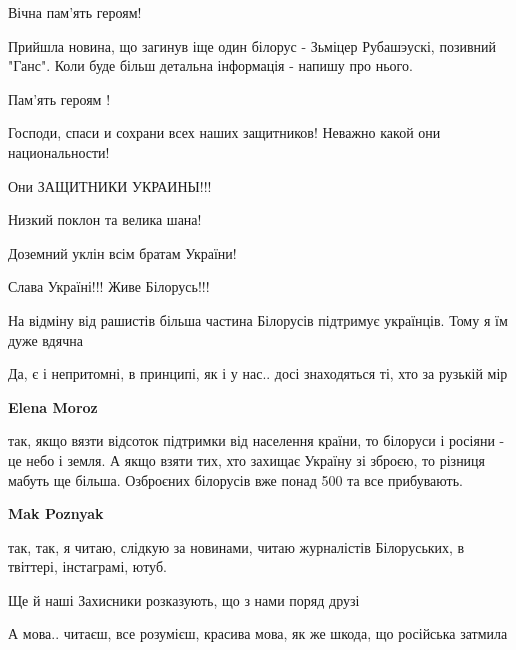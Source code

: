  
 
 
 
 
\zzSecCmt

\begin{itemize} %
Вічна пам'ять героям!

Прийшла новина, що загинув іще один білорус - Зьміцер Рубашэускі, позивний "Ганс". Коли буде більш детальна інформація - напишу про нього.

Пам’ять героям !


Господи, спаси и сохрани всех наших защитников! Неважно какой они
национальности!

Они ЗАЩИТНИКИ УКРАИНЫ!!!

Низкий поклон та велика шана!

Доземний уклін всім братам України!

Слава Україні!!!
Живе Білорусь!!!


На відміну від рашистів більша частина Білорусів підтримує українців. Тому я їм дуже вдячна

Да, є і непритомні, в принципі, як і у нас.. досі знаходяться ті, хто за рузькій мір

\begin{itemize} %
\textbf{Elena Moroz} 

так, якщо вязти відсоток підтримки від населення країни, то білоруси і росіяни
- це небо і земля. А якщо взяти тих, хто захищає Україну зі зброєю, то різниця
мабуть ще більша. Озброєних білорусів вже понад 500 та все прибувають.

\textbf{Mak Poznyak} 

так, так, я читаю, слідкую за новинами, читаю журналістів Білоруських, в
твіттері, інстаграмі, ютуб.

Ще й наші Захисники розказують, що з нами поряд друзі

А мова.. читаєш, все розумієш, красива мова, як же шкода, що російська затмила


\end{itemize}
\end{itemize}
